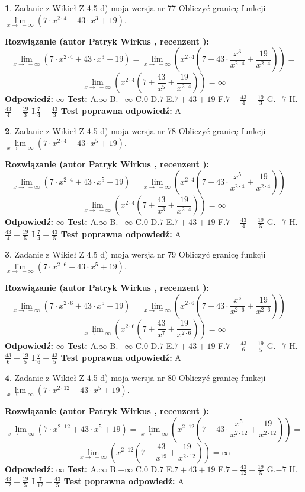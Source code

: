 \documentclass[12pt, a4paper]{article}
\theoremstyle{definition} %
\newtheorem{zad}{}
\newcommand{\zadStart}[1]{\begin{zad}#1\newline}
\newcommand{\zadStop}{\end{zad}}
\newcommand{\rozwStart}[2]{\noindent \textbf{Rozwiązanie (autor #1 , recenzent #2): }\newline}
\newcommand{\rozwStop}{\newline}
\newcommand{\odpStart}{\noindent \textbf{Odpowiedź:}\newline}
\newcommand{\odpStop}{\newline}
\newcommand{\testStart}{\noindent \textbf{Test:}\newline}
\newcommand{\testStop}{\newline}
\newcommand{\kluczStart}{\noindent \textbf{Test poprawna odpowiedź:}\newline}
\newcommand{\kluczStop}{\newline}
\begin{document}
\zadStart{Zadanie z Wikieł Z 4.5 d) moja wersja nr 77}
Obliczyć granicę funkcji  $\lim\limits_{x\to\ -\infty}(7 \cdot x^{2\cdot4}+43 \cdot x^{3}+19)$.
\zadStop
\rozwStart{Patryk Wirkus}{}
$$\lim\limits_{x\to\ -\infty}(7 \cdot x^{2\cdot4}+43 \cdot x^{3}+19) = \lim\limits_{x\to\ -\infty}(x^{2\cdot4}(7 +43 \cdot \frac{x^{3}}{x^{2\cdot4}}+\frac{19}{x^{2\cdot4}})) =$$ $$\lim\limits_{x\to\ -\infty}(x^{2\cdot4}(7 +\frac{43}{x^{5}}+\frac{19}{x^{2\cdot4}})) =\infty$$
\rozwStop
\odpStart
$\infty$
\odpStop
\testStart
A.$\infty$ B.$-\infty$ C.$0$ D.$7$ E.$7 + 43 + 19$
F.$7+\frac{43}{4}+\frac{19}{3}$ G.$-7$
H.$\frac{43}{4}+\frac{19}{3}$
I.$\frac{7}{4}+\frac{43}{3}$
\testStop
\kluczStart
A
\kluczStop



\zadStart{Zadanie z Wikieł Z 4.5 d) moja wersja nr 78}
Obliczyć granicę funkcji  $\lim\limits_{x\to\ -\infty}(7 \cdot x^{2\cdot4}+43 \cdot x^{5}+19)$.
\zadStop
\rozwStart{Patryk Wirkus}{}
$$\lim\limits_{x\to\ -\infty}(7 \cdot x^{2\cdot4}+43 \cdot x^{5}+19) = \lim\limits_{x\to\ -\infty}(x^{2\cdot4}(7 +43 \cdot \frac{x^{5}}{x^{2\cdot4}}+\frac{19}{x^{2\cdot4}})) =$$ $$\lim\limits_{x\to\ -\infty}(x^{2\cdot4}(7 +\frac{43}{x^{3}}+\frac{19}{x^{2\cdot4}})) =\infty$$
\rozwStop
\odpStart
$\infty$
\odpStop
\testStart
A.$\infty$ B.$-\infty$ C.$0$ D.$7$ E.$7 + 43 + 19$
F.$7+\frac{43}{4}+\frac{19}{5}$ G.$-7$
H.$\frac{43}{4}+\frac{19}{5}$
I.$\frac{7}{4}+\frac{43}{5}$
\testStop
\kluczStart
A
\kluczStop



\zadStart{Zadanie z Wikieł Z 4.5 d) moja wersja nr 79}
Obliczyć granicę funkcji  $\lim\limits_{x\to\ -\infty}(7 \cdot x^{2\cdot6}+43 \cdot x^{5}+19)$.
\zadStop
\rozwStart{Patryk Wirkus}{}
$$\lim\limits_{x\to\ -\infty}(7 \cdot x^{2\cdot6}+43 \cdot x^{5}+19) = \lim\limits_{x\to\ -\infty}(x^{2\cdot6}(7 +43 \cdot \frac{x^{5}}{x^{2\cdot6}}+\frac{19}{x^{2\cdot6}})) =$$ $$\lim\limits_{x\to\ -\infty}(x^{2\cdot6}(7 +\frac{43}{x^{7}}+\frac{19}{x^{2\cdot6}})) =\infty$$
\rozwStop
\odpStart
$\infty$
\odpStop
\testStart
A.$\infty$ B.$-\infty$ C.$0$ D.$7$ E.$7 + 43 + 19$
F.$7+\frac{43}{6}+\frac{19}{5}$ G.$-7$
H.$\frac{43}{6}+\frac{19}{5}$
I.$\frac{7}{6}+\frac{43}{5}$
\testStop
\kluczStart
A
\kluczStop



\zadStart{Zadanie z Wikieł Z 4.5 d) moja wersja nr 80}
Obliczyć granicę funkcji  $\lim\limits_{x\to\ -\infty}(7 \cdot x^{2\cdot12}+43 \cdot x^{5}+19)$.
\zadStop
\rozwStart{Patryk Wirkus}{}
$$\lim\limits_{x\to\ -\infty}(7 \cdot x^{2\cdot12}+43 \cdot x^{5}+19) = \lim\limits_{x\to\ -\infty}(x^{2\cdot12}(7 +43 \cdot \frac{x^{5}}{x^{2\cdot12}}+\frac{19}{x^{2\cdot12}})) =$$ $$\lim\limits_{x\to\ -\infty}(x^{2\cdot12}(7 +\frac{43}{x^{19}}+\frac{19}{x^{2\cdot12}})) =\infty$$
\rozwStop
\odpStart
$\infty$
\odpStop
\testStart
A.$\infty$ B.$-\infty$ C.$0$ D.$7$ E.$7 + 43 + 19$
F.$7+\frac{43}{12}+\frac{19}{5}$ G.$-7$
H.$\frac{43}{12}+\frac{19}{5}$
I.$\frac{7}{12}+\frac{43}{5}$
\testStop
\kluczStart
A
\kluczStop
\end{document}
